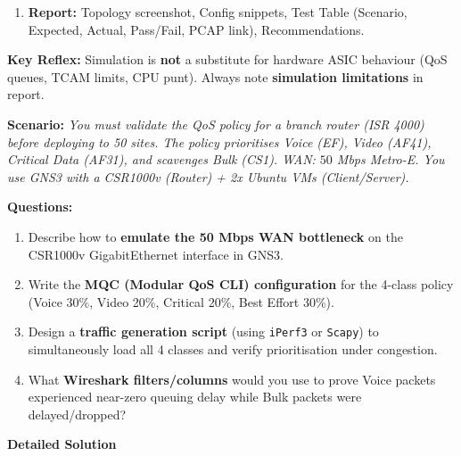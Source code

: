 \documentclass[11pt]{article}
\begin{document}
\begin{methode}
\begin{enumerate}
\begin{itemize}
        \item Convergence Timing: \texttt{show ip route} timestamps, EIGRP/OSPF event logs, BFD flaps.
    \end{itemize}
    \item \textbf{Report:} Topology screenshot, Config snippets, Test Table (Scenario, Expected, Actual, Pass/Fail, PCAP link), Recommendations.
\end{enumerate}
\textbf{Key Reflex:} Simulation is \textbf{not} a substitute for hardware ASIC behaviour (QoS queues, TCAM limits, CPU punt). Always note \textbf{simulation limitations} in report.
\end{methode}

\begin{exoresolu}
\textbf{Scenario:} \textit{You must validate the QoS policy for a branch router (ISR 4000) before deploying to 50 sites. The policy prioritises Voice (EF), Video (AF41), Critical Data (AF31), and scavenges Bulk (CS1). WAN: $50$ Mbps Metro-E. You use GNS3 with a CSR1000v (Router) + 2x Ubuntu VMs (Client/Server).}

\textbf{Questions:}
\begin{enumerate}
    \item Describe how to \textbf{emulate the 50 Mbps WAN bottleneck} on the CSR1000v GigabitEthernet interface in GNS3.
    \item Write the \textbf{MQC (Modular QoS CLI) configuration} for the 4-class policy (Voice 30\%, Video 20\%, Critical 20\%, Best Effort 30\%).
    \item Design a \textbf{traffic generation script} (using \texttt{iPerf3} or \texttt{Scapy}) to simultaneously load all 4 classes and verify prioritisation under congestion.
    \item What \textbf{Wireshark filters/columns} would you use to prove Voice packets experienced near-zero queuing delay while Bulk packets were delayed/dropped?
\end{enumerate}
\tcblower
\textbf{Detailed Solution}


\end{exoresolu}
\end{document}
